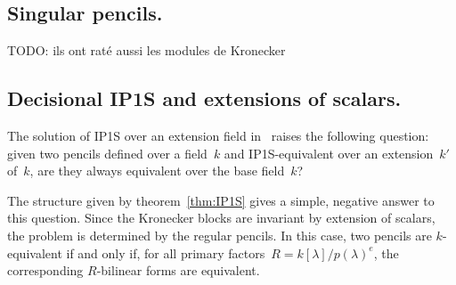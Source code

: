 \documentclass{lms}
\def\todo#1{{\color{orange}TODO: #1}}
\begin{document}
\subsection{Singular pencils.}
\todo{ils ont raté aussi les modules de Kronecker}


\subsection{Decisional IP1S and extensions of scalars.}

The solution of IP1S over an extension field
in~\cite{DBLP:journals/corr/BerthomieuFP13} raises the following
question: given two pencils defined over a field~$k$
and IP1S-equivalent over an extension~$k'$ of~$k$, are they always
equivalent over the base field~$k$?

The structure given by theorem~\ref{thm:IP1S}
gives a simple, negative answer to this question.
Since the Kronecker blocks are invariant by extension of scalars,
the problem is determined by the regular pencils.
In this case, two pencils are $k$-equivalent
if and only if, for all primary factors~$R =k[λ]/p(λ)^e$,
the corresponding $R$-bilinear forms are equivalent.
\end{document}

